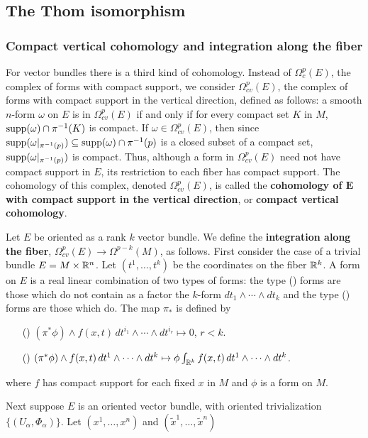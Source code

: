 \subsection{The Thom isomorphism}
\subsubsection{Compact vertical cohomology and integration along the fiber}
For vector bundles there is a third kind of cohomology. Instead of $\Omega^p_c(E)$, the complex of forms with compact support, we consider $\Omega_{cv}^p(E)$, the 
complex of forms with compact support in the vertical direction, defined as follows: a smooth $n$-form $\omega$ on $E$ is in $\Omega^p_{cv}(E)$ if and only if for 
every compact set $K$ in $M$, $\mathrm{supp}(\omega)\cap\pi^{-1}(K)$ is compact. If $\omega\in\Omega^p_{cv}(E)$, then since $\mathrm{supp}(\omega|_{\pi^{-1}(p)})\subseteq\mathrm{supp}(\omega)\cap\pi^{-1}(p)$ 
is a  closed subset of a compact set, $\mathrm{supp}(\omega|_{\pi^{-1}(p)})$ is compact. Thus, although a form in $\Omega^p_{cv}(E)$ need not have compact support in $E$, its 
restriction to each fiber has compact support. The cohomology of this complex, denoted $\Omega^p_{cv}(E)$, is called the \textbf{cohomology of $\bm{E}$ with compact 
support in the vertical direction}, or \textbf{compact vertical cohomology}.\par
Let $E$ be oriented as a rank $k$ vector bundle. We define the \textbf{integration along the fiber}, $\Omega^p_{cv}(E)\to\Omega^{p-k}(M)$, as follows. First consider 
the case of a trivial bundle $E=M\times\mathbb{R}^n$. Let $(t^1,\dots,t^k)$ be the coordinates on the fiber $\mathbb{R}^k$. A form on $E$ is a real linear combination of two types of 
forms: the type () forms are those which do not contain as a factor the $k$-form $dt_1\wedge\cdots\wedge dt_k$ and the type () forms are those which 
do. The map $\pi_*$ is defined by
\begin{itemize}
\item[(\rmnum{1})] $(\pi^*\phi)\wedge f(x,t)\,dt^{i_1}\wedge\cdots\wedge dt^{i_r}\mapsto 0$, $r<k$.
\item[(\rmnum{2})] $(\pi^*\phi)\wedge f(x,t)\,dt^{1}\wedge\cdots\wedge dt^{k}\mapsto \phi\int_{\mathbb{R}^k}f(x,t)\,dt^1\wedge\cdots\wedge dt^k$.
\end{itemize}
where $f$ has compact support for each fixed $x$ in $M$ and $\phi$ is a form on $M$.\par
Next suppose $E$ is an oriented vector bundle, with oriented trivialization $\{(U_\alpha,\varPhi_\alpha)\}$. Let $(x^1,\dots,x^n)$ and $(\widetilde{x}^1,\dots,\widetilde{x}^n)$ 
